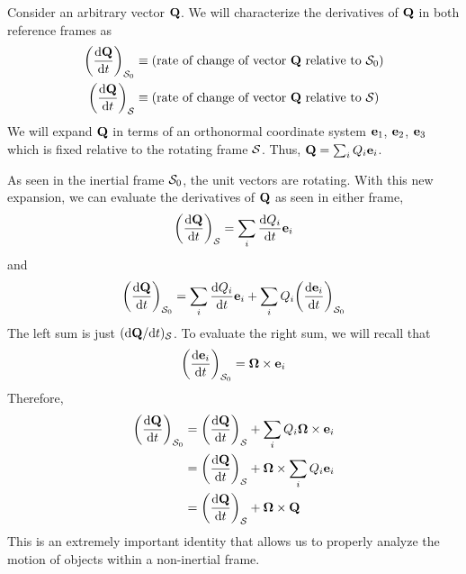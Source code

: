 Consider an arbitrary vector $\mathbf{Q}$. We will characterize the derivatives of $\mathbf{Q}$ in both reference frames as
\begin{align*}
    \pqty{\dv{\mbf Q}{t}}_{\mcl S_0} &\equiv \text{(rate of change of vector $\mbf Q$ relative to $\mcl S_0$)} \\
    \pqty{\dv{\mbf Q}{t}}_{\mcl S} &\equiv \text{(rate of change of vector $\mbf Q$ relative to $\mcl S$)}
\end{align*}
We will expand $\mathbf{Q}$ in terms of an orthonormal coordinate system $\mathbf{e}_1$, $\mathbf{e}_2$, $\mathbf{e}_3$ which is fixed relative to the rotating frame $\mathcal{S}$. Thus, $\mathbf{Q} = \sum_iQ_i\mathbf{e}_i$.

As seen in the inertial frame $\mathcal{S}_0$, the unit vectors are rotating. With this new expansion, we can evaluate the derivatives of $\mathbf{Q}$ as seen in either frame,
\[ \pqty{\dv{\mbf Q}{t}}_{\mcl S} = \sum_i \dv{Q_i}{t} \mbf e_i\]
and
\[ \pqty{\dv{\mbf Q}{t}}_{\mcl S_0} =\sum_i \dv{Q_i}{t}\mbf e_i + \sum_i Q_i\pqty{\dv{\mbf e_i}{t}}_{\mcl S_0}\]
The left sum is just $(\dd \mathbf{Q}/\dd t)_{\mathcal{S}}$. To evaluate the right sum, we will recall that
\[ \pqty{\dv{\mbf e_i}{t}}_{\mcl S_0} = \bsm\Omega \times \mbf e_i\]
Therefore,
\begin{align*}
    \pqty{\dv{\mbf Q}{t}}_{\mcl S_0} &= \pqty{\dv{\mbf Q}{t}}_{\mcl S} + \sum_i Q_i \bsm\Omega\times \mbf e_i \\
    &= \pqty{\dv{\mbf Q}{t}}_{\mcl S} + \bsm\Omega \times \sum_i Q_i\mbf e_i \\
    &= \pqty{\dv{\mbf Q}{t}}_{\mcl S} + \bsm\Omega \times \mbf Q
\end{align*}
This is an extremely important identity that allows us to properly analyze  the motion of objects within a non-inertial frame.
